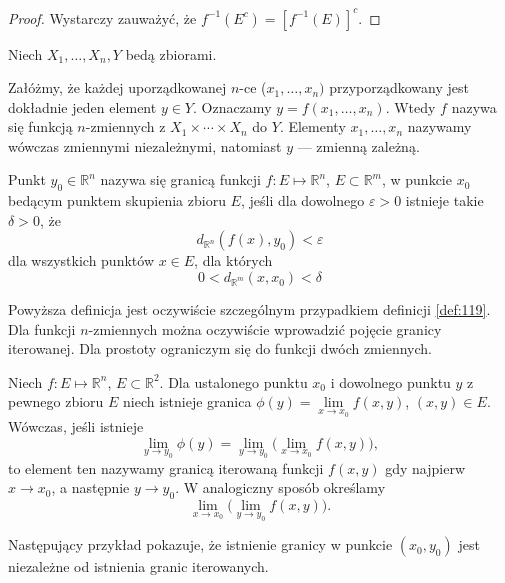 \documentclass[leqno]{article}
\begin{document}
\begin{justify}
\begin{proof}
    Wystarczy zauważyć, że $f^{-1}(E^c) = {[f^{-1}(E)]}^c$.
\end{proof}

Niech $X_1, \ldots, X_n, Y$ bedą zbiorami.

\begin{defn}
    Załóżmy, że każdej uporządkowanej $n$-ce ($x_1, \ldots, x_n)$ przyporządkowany jest 
    dokładnie jeden element $y \in Y$. Oznaczamy $y = f(x_1, \ldots, x_n)$. Wtedy $f$ nazywa się funkcją
    $n$-zmiennych z $X_1 \times \cdots \times X_n$ do $Y$.
    Elementy $x_1, \ldots, x_n$ nazywamy wówczas zmiennymi niezależnymi, natomiast $y$ --- zmienną zależną.
\end{defn}

\begin{defn}
    Punkt $y_0 \in \mathbb{R}^n$ nazywa się granicą funkcji $f : E \mapsto \mathbb{R}^n$, $E \subset \mathbb{R}^m$,
    w punkcie $x_0$ bedącym punktem skupienia zbioru $E$, jeśli dla dowolnego $\varepsilon > 0$ istnieje takie $\delta > 0$, że 
    \[
        d_{\mathbb{R}^n}(f(x), y_0) < \varepsilon
    \]
    dla wszystkich punktów $x \in E$, dla których
    \[
        0 < d_{\mathbb{R}^m}(x, x_0) < \delta
    \]
\end{defn}

Powyższa definicja jest oczywiście szczególnym przypadkiem definicji \ref{def:119}. Dla funkcji $n$-zmiennych można
oczywiście wprowadzić pojęcie granicy iterowanej.
Dla prostoty ograniczym się do funkcji dwóch zmiennych.

\begin{defn}
    Niech $f : E \mapsto \mathbb{R}^n$, $E \subset \mathbb{R}^2$. Dla ustalonego punktu $x_0$ i dowolnego punktu $y$ z pewnego zbioru
    $E$ niech istnieje granica $\phi(y) = \lim\limits_{x \to x_0}f(x, y)$, $(x, y) \in E$.
    Wówczas, jeśli istnieje
    \[
        \lim_{y \to y_0}\phi(y) = \lim_{y \to y_0}\Big(\lim_{x \to x_0}f(x,y)\Big),
    \]
    to element ten nazywamy granicą iterowaną funkcji $f(x, y)$ gdy najpierw $x \to x_0$, a następnie $y \to y_0$.
    W analogiczny sposób określamy
    \[
        \lim_{x \to x_0}\Big(\lim_{y \to y_0}f(x,y)\Big).
    \]
\end{defn}

Następujący przykład pokazuje, że istnienie granicy w punkcie $(x_0, y_0)$ jest niezależne od istnienia granic iterowanych.


\end{justify}
\end{document}
